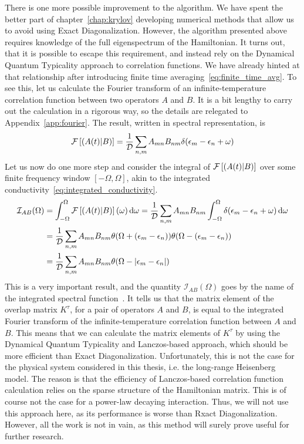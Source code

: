 There is one more possible improvement to the algorithm. We have spent the better part of chapter~\ref{chap:krylov}
developing numerical methods that allow us to avoid using Exact Diagonalization. However, the algorithm presented
above requires knowledge of the full eigenspectrum of the Hamiltonian. It turns out, that it is possible
to escape this requirement, and instead rely on the Dynamical Quantum Typicality approach to correlation functions.
We have already hinted at that relationship after introducing finite time averaging~\eqref{eq:finite_time_avg}.
To see this, let us calculate the Fourier transform of an infinite-temperature correlation function between
two operators \(A\) and \(B\). It is a bit lengthy to carry out the calculation in a rigorous way, so the
details are relegated to Appendix~\ref{app:fourier}. The result, written in spectral representation, is
\begin{equation}
  \mathcal{F}\left[\left(A(t) \middle| B\right)\right] = \frac{1}{\mathcal{D}}\sum_{n,m} A_{mn} B_{nm} \delta(\epsilon_m-\epsilon_n+\omega)
  \label{eq:fourier_corr}
\end{equation}
Let us now do one more step and consider the integral of \(\mathcal{F}\left[\left(A(t) \middle| B\right)\right]\) over
some finite frequency window \([-\Omega, \Omega]\), akin to the integrated conductivity~\eqref{eq:integrated_conductivity}.
\begin{align}
  \mathcal{I}_{AB}(\Omega) & = \int_{-\Omega}^{\Omega} \mathcal{F}\left[\left(A(t) \middle| B\right)\right](\omega) \dd{\omega } =
  \frac{1}{\mathcal{D}}\sum_{n,m} A_{mn} B_{nm} \int_{-\Omega}^{\Omega} 
  \delta(\epsilon_m-\epsilon_n+\omega)\dd{\omega }  \nonumber                                                                         \\ &= \frac{1}{\mathcal{D}}\sum_{n,m} A_{mn} B_{nm}
  \theta(\Omega + (\epsilon_m-\epsilon_n))\theta(\Omega - (\epsilon_m-\epsilon_n)) \nonumber                             \\
                           & = \frac{1}{\mathcal{D}}\sum_{n,m} A_{mn} B_{nm}\theta(\Omega - \abs{\epsilon_m-\epsilon_n})
  \label{eq:integrated_spectral}
\end{align}
This is a very important result, and the quantity \(\mathcal{I}_{AB}(\Omega)\) goes by the name of
the integrated spectral function~\autocite{Vidmar2021}.
It tells us that the matrix element of the overlap matrix \(K^{\tau}\),
for a pair of operators \(A\) and \(B\), is equal to the integrated Fourier transform of the infinite-temperature
correlation function between \(A\) and \(B\). This means that we can calculate the matrix elements of \(K^{\tau}\)
by using the Dynamical Quantum Typicality and Lanczos-based approach, which should be more efficient than Exact Diagonalization.
Unfortunately, this is not the case for the  physical system considered in this thesis,
i.e. the long-range Heisenberg model. The reason is that the efficiency of Lanczos-based
correlation function calculation relies on the sparse structure of the Hamiltonian matrix.
This is of course not the case for a power-law decaying interaction. Thus, we will not use this approach
here, as its performance is worse than Rxact Diagonalization. However, all the work is not in vain, as this method will surely prove useful
for further research.

